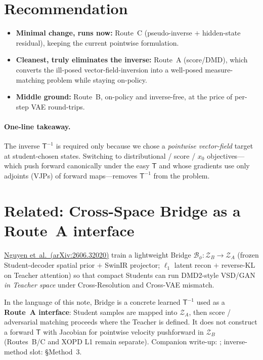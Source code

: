 \documentclass[11pt,a4paper]{article}
\newcommand{\Za}{\mathcal{Z}_{A}}
\newcommand{\Zb}{\mathcal{Z}_{B}}
\newcommand{\Tmap}{\mathsf{T}}
\newcommand{\Tinv}{\mathsf{T}^{-1}}
\theoremstyle{definition}
\begin{document}
\section{Recommendation}
\label{sec:reco}

\begin{itemize}[leftmargin=1.4em,itemsep=2pt]
  \item \textbf{Minimal change, runs now:} Route~C (pseudo-inverse $+$ hidden-state residual),
        keeping the current pointwise formulation.
  \item \textbf{Cleanest, truly eliminates the inverse:} Route~A (score/DMD), which converts the
        ill-posed vector-field-inversion into a well-posed measure-matching problem while staying
        on-policy.
  \item \textbf{Middle ground:} Route~B, on-policy and inverse-free, at the price of per-step VAE
        round-trips.
\end{itemize}

\paragraph{One-line takeaway.}
The inverse $\Tinv$ is required only because we chose a \emph{pointwise vector-field} target at
student-chosen states. Switching to distributional / score / $x_0$ objectives---which push
forward canonically under the easy $\Tmap$ and whose gradients use only adjoints (VJPs) of
forward maps---removes $\Tinv$ from the problem.

\section{Related: Cross-Space Bridge as a Route~A interface}
\label{sec:bridge-related}

\href{https://arxiv.org/abs/2606.32020}{Nguyen et~al.\ (arXiv:2606.32020)} train a lightweight
Bridge $\mathcal{B}_\phi:\Zb\to\Za$ (frozen Student-decoder spatial prior $+$ SwinIR projector;
$\ell_1$ latent recon $+$ reverse-KL on Teacher attention) so that compact Students can run
DMD2-style VSD/GAN \emph{in Teacher space} under Cross-Resolution and Cross-VAE mismatch.

In the language of this note, Bridge is a concrete learned $\Tinv$ used as a
\textbf{Route~A interface}: Student samples are mapped into $\Za$, then score / adversarial
matching proceeds where the Teacher is defined. It does not construct a forward $\Tmap$ with
Jacobian for pointwise velocity pushforward in $\Zb$ (Routes~B/C and XOPD L1 remain separate).
Companion write-up: ; inverse-method
slot:  \S Method~3.
\end{document}
